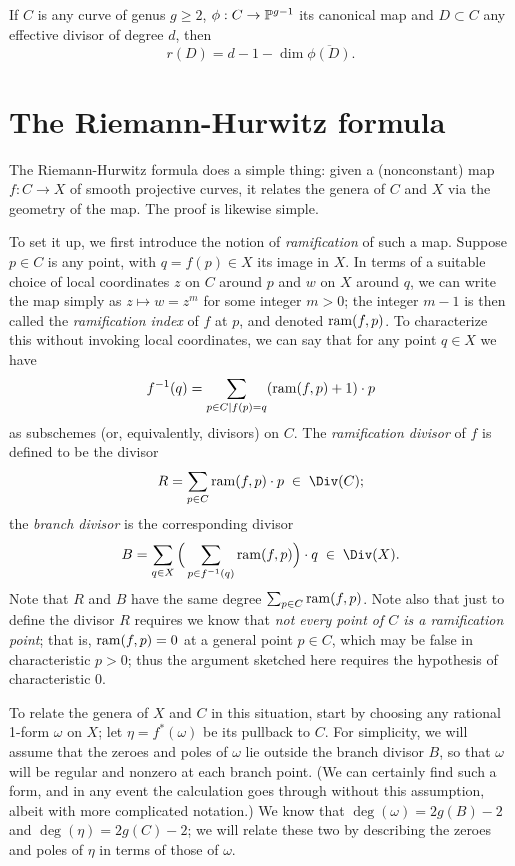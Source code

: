 \begin{theorem}
If $C$ is any curve of genus $g \geq 2$,  $\phi : C \to \PP^{g-1}$ its canonical map and $D \subset C$ any effective divisor of degree $d$, then
$$
r(D) = d - 1 - \dim \overline{\phi(D)}.
$$
\end{theorem}

 \section{The Riemann-Hurwitz formula}
 
 The Riemann-Hurwitz formula does a simple thing: given a (nonconstant) map $f : C \to X$ of smooth projective curves, it relates the genera of $C$ and $X$ via the geometry of the map. The proof is likewise simple.
 
 To set it up, we first introduce the notion of \emph{ramification} of such a map. Suppose $p \in C$ is any point, with $q = f(p) \in X$ its image in $X$. In terms of a suitable choice of local coordinates $z$ on $C$ around $p$ and $w$ on $X$ around $q$, we can write the map simply as $z \mapsto w = z^m$ for some integer $m > 0$; the integer $m-1$ is then called the \emph{ramification index} of $f$ at $p$, and denoted $\ram(f,p)$. To characterize this without invoking local coordinates, we can say that for any point $q \in X$ we have
 $$
 f^{-1}(q) = \sum_{p\in C \mid f(p)=q} (\ram(f,p)+1)\cdot p
 $$
 as subschemes (or, equivalently, divisors) on $C$. The \emph{ramification divisor} of $f$ is defined to be the divisor
 $$
 R = \sum_{p \in C} \ram(f,p)\cdot p \; \in \;  \Div(C);
 $$
 the \emph{branch divisor} is the corresponding divisor
 $$
 B = \sum_{q \in X} \Big(\sum_{p \in f^{-1}(q)} \ram(f,p) \Big)\cdot q \; \in \; \Div(X).
 $$
 Note that $R$ and $B$ have the same degree $\sum_{p \in C} \ram(f,p)$. Note also that just to define the divisor $R$ requires we know that \emph{not every point of $C$ is a ramification point}; that is, $\ram(f,p) = 0$ at a general point $p \in C$, which may be false in characteristic $p > 0$; thus the argument sketched here requires the hypothesis of characteristic 0.
 
 To relate the genera of $X$ and $C$ in this situation, start by choosing any rational 1-form $\omega$ on $X$; let $\eta = f^*(\omega)$ be its pullback to $C$. For simplicity, we will assume that the zeroes and poles of $\omega$ lie outside the branch divisor $B$, so that $\omega$ will be regular and nonzero at each branch point. (We can certainly find such a form, and in any event the calculation goes through without this assumption, albeit with more complicated notation.) We know that $\deg(\omega) = 2g(B) - 2$ and $\deg(\eta) = 2g(C) - 2$; we will relate these two by describing the zeroes and poles of $\eta$ in terms of those of $\omega$.
 
